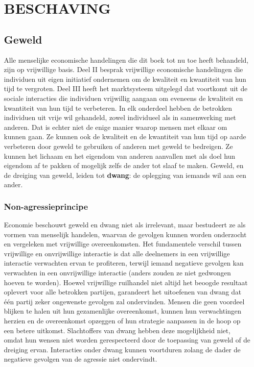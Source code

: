 \documentclass[
  a5paper,
  smalldemyvopaper,11pt,twoside,onecolumn,openright,extrafontsizes,
hidelinks]{memoir}
\begin{document}
\part{BESCHAVING}

\chapter{Geweld}\label{sec-geweld}

Alle menselijke economische handelingen die dit boek tot nu toe heeft
behandeld, zijn op vrijwillige basis. Deel II besprak vrijwillige
economische handelingen die individuen uit eigen initiatief ondernemen
om de kwaliteit en kwantiteit van hun tijd te vergroten. Deel III heeft
het marktsysteem uitgelegd dat voortkomt uit de sociale interacties die
individuen vrijwillig aangaan om eveneens de kwaliteit en kwantiteit van
hun tijd te verbeteren. In elk onderdeel hebben de betrokken individuen
uit vrije wil gehandeld, zowel individueel als in samenwerking met
anderen. Dat is echter niet de enige manier waarop mensen met elkaar om
kunnen gaan. Ze kunnen ook de kwaliteit en de kwantiteit van hun tijd op
aarde verbeteren door geweld te gebruiken of anderen met geweld te
bedreigen. Ze kunnen het lichaam en het eigendom van anderen aanvallen
met als doel hun eigendom af te pakken of mogelijk zelfs de ander tot
slaaf te maken. Geweld, en de dreiging van geweld, leiden tot
\textbf{dwang}: de oplegging van iemands wil aan een ander.

\section{Non-agressieprincipe}\label{non-agressieprincipe}

Economie beschouwt geweld en dwang niet als irrelevant, maar bestudeert
ze als vormen van menselijk handelen, waarvan de gevolgen kunnen worden
onderzocht en vergeleken met vrijwillige overeenkomsten. Het
fundamentele verschil tussen vrijwillige en onvrijwillige interactie is
dat alle deelnemers in een vrijwillige interactie verwachten ervan te
profiteren, terwijl iemand negatieve gevolgen kan verwachten in een
onvrijwillige interactie (anders zouden ze niet gedwongen hoeven te
worden). Hoewel vrijwillige ruilhandel niet altijd het beoogde resultaat
oplevert voor alle betrokken partijen, garandeert het uitoefenen van
dwang dat één partij zeker ongewenste gevolgen zal ondervinden. Mensen
die geen voordeel blijken te halen uit hun gezamenlijke overeenkomst,
kunnen hun verwachtingen herzien en de overeenkomst opzeggen of hun
strategie aanpassen in de hoop op een betere uitkomst. Slachtoffers van
dwang hebben deze mogelijkheid niet, omdat hun wensen niet worden
gerespecteerd door de toepassing van geweld of de dreiging ervan.
Interacties onder dwang kunnen voortduren zolang de dader de negatieve
gevolgen van de agressie niet ondervindt.
\end{document}
